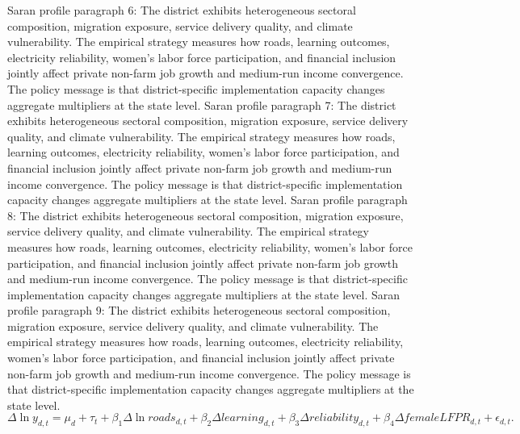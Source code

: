 \documentclass[preprint,12pt]{elsarticle}
\begin{document}
Saran profile paragraph 6: The district exhibits heterogeneous sectoral composition, migration exposure, service delivery quality, and climate vulnerability. The empirical strategy measures how roads, learning outcomes, electricity reliability, women's labor force participation, and financial inclusion jointly affect private non-farm job growth and medium-run income convergence. The policy message is that district-specific implementation capacity changes aggregate multipliers at the state level.
Saran profile paragraph 7: The district exhibits heterogeneous sectoral composition, migration exposure, service delivery quality, and climate vulnerability. The empirical strategy measures how roads, learning outcomes, electricity reliability, women's labor force participation, and financial inclusion jointly affect private non-farm job growth and medium-run income convergence. The policy message is that district-specific implementation capacity changes aggregate multipliers at the state level.
Saran profile paragraph 8: The district exhibits heterogeneous sectoral composition, migration exposure, service delivery quality, and climate vulnerability. The empirical strategy measures how roads, learning outcomes, electricity reliability, women's labor force participation, and financial inclusion jointly affect private non-farm job growth and medium-run income convergence. The policy message is that district-specific implementation capacity changes aggregate multipliers at the state level.
Saran profile paragraph 9: The district exhibits heterogeneous sectoral composition, migration exposure, service delivery quality, and climate vulnerability. The empirical strategy measures how roads, learning outcomes, electricity reliability, women's labor force participation, and financial inclusion jointly affect private non-farm job growth and medium-run income convergence. The policy message is that district-specific implementation capacity changes aggregate multipliers at the state level.
\begin{equation}\Delta \ln y_{d,t}=\mu_d+\tau_t+\beta_1\Delta\ln roads_{d,t}+\beta_2\Delta learning_{d,t}+\beta_3\Delta reliability_{d,t}+\beta_4\Delta femaleLFPR_{d,t}+\epsilon_{d,t}.\end{equation}
\end{document}

